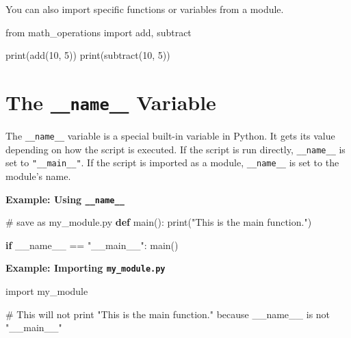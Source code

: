 \documentclass[
  letterpaper,
  DIV=11,
  numbers=noendperiod]{scrreprt}
\newenvironment{Shaded}{\begin{snugshade}}{\end{snugshade}}
\newcommand{\BuiltInTok}[1]{\textcolor[rgb]{0.00,0.23,0.31}{#1}}
\newcommand{\CommentTok}[1]{\textcolor[rgb]{0.37,0.37,0.37}{#1}}
\newcommand{\ControlFlowTok}[1]{\textcolor[rgb]{0.00,0.23,0.31}{\textbf{#1}}}
\newcommand{\DecValTok}[1]{\textcolor[rgb]{0.68,0.00,0.00}{#1}}
\newcommand{\ImportTok}[1]{\textcolor[rgb]{0.00,0.46,0.62}{#1}}
\newcommand{\KeywordTok}[1]{\textcolor[rgb]{0.00,0.23,0.31}{\textbf{#1}}}
\newcommand{\NormalTok}[1]{\textcolor[rgb]{0.00,0.23,0.31}{#1}}
\newcommand{\OperatorTok}[1]{\textcolor[rgb]{0.37,0.37,0.37}{#1}}
\newcommand{\StringTok}[1]{\textcolor[rgb]{0.13,0.47,0.30}{#1}}
\newcommand{\VariableTok}[1]{\textcolor[rgb]{0.07,0.07,0.07}{#1}}
\begin{document}
You can also import specific functions or variables from a module.

\begin{Shaded}
\begin{Highlighting}[]
\ImportTok{from}\NormalTok{ math\_operations }\ImportTok{import}\NormalTok{ add, subtract}

\BuiltInTok{print}\NormalTok{(add(}\DecValTok{10}\NormalTok{, }\DecValTok{5}\NormalTok{))}
\BuiltInTok{print}\NormalTok{(subtract(}\DecValTok{10}\NormalTok{, }\DecValTok{5}\NormalTok{))}
\end{Highlighting}
\end{Shaded}

\section{\texorpdfstring{The \texttt{\_\_name\_\_}
Variable}{The \_\_name\_\_ Variable}}\label{the-__name__-variable}

The \texttt{\_\_name\_\_} variable is a special built-in variable in
Python. It gets its value depending on how the script is executed. If
the script is run directly, \texttt{\_\_name\_\_} is set to
\texttt{"\_\_main\_\_"}. If the script is imported as a module,
\texttt{\_\_name\_\_} is set to the module's name.

\textbf{Example: Using \texttt{\_\_name\_\_}}

\begin{Shaded}
\begin{Highlighting}[]
\CommentTok{\# save as my\_module.py}
\KeywordTok{def}\NormalTok{ main():}
    \BuiltInTok{print}\NormalTok{(}\StringTok{"This is the main function."}\NormalTok{)}

\ControlFlowTok{if} \VariableTok{\_\_name\_\_} \OperatorTok{==} \StringTok{"\_\_main\_\_"}\NormalTok{:}
\NormalTok{    main()}
\end{Highlighting}
\end{Shaded}

\textbf{Example: Importing \texttt{my\_module.py}}

\begin{Shaded}
\begin{Highlighting}[]
\ImportTok{import}\NormalTok{ my\_module}

\CommentTok{\# This will not print "This is the main function." because \_\_name\_\_ is not "\_\_main\_\_"}
\end{Highlighting}
\end{Shaded}
\end{document}
